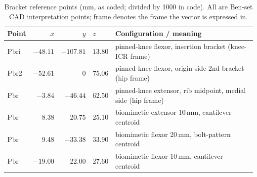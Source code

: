 
\begin{table}[htbp]
\caption{Bracket reference points (mm, as coded; divided by 1000 in code). All are Ben-set CAD interpretation points; frame denotes the frame the vector is expressed in.}
\label{tab:app_bracket_points}
\begin{tabular}{@{}lrrll@{}}
\toprule
\textbf{Point} & $x$ & $y$ & $z$ & \textbf{Configuration / meaning} \\
\midrule
Pbri & $-48.11$ & $-107.81$ & $13.80$ & pinned-knee flexor, insertion bracket (knee-ICR frame) \\
Pbr2 & $-52.61$ & 0 & 75.06 & pinned-knee flexor, origin-side 2nd bracket (hip frame) \\
Pbr  & $-3.84$  & $-46.44$ & 62.50 & pinned-knee extensor, rib midpoint, medial side (hip frame) \\
Pbr  & 8.38 & 20.75 & 25.10 & biomimetic extensor 10\,mm, cantilever centroid \\
Pbr  & 9.48 & $-33.38$ & 33.90 & biomimetic flexor 20\,mm, bolt-pattern centroid \\
Pbr  & $-19.00$ & 22.00 & 27.60 & biomimetic flexor 10\,mm, cantilever centroid \\
\bottomrule
\end{tabular}
\end{table}

